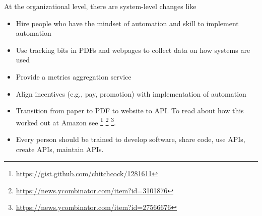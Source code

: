 At the organizational level, there are system-level changes like
\begin{itemize}
    \item Hire people who have the mindset of automation and skill to implement automation
    \item Use tracking bits in PDFs and webpages to collect data on how systems are used
    \item Provide a metrics aggregation service
    \item Align incentives (e.g., pay, promotion) with implementation of automation
    \item Transition from paper to PDF to website to API. To read about how this worked out at Amazon see \footnote{\href{https://gist.github.com/chitchcock/1281611}{https://gist.github.com/chitchcock/1281611}}
    \footnote{\href{https://news.ycombinator.com/item?id=3101876}{https://news.ycombinator.com/item?id=3101876}}
    \footnote{\href{https://news.ycombinator.com/item?id=27566676}{https://news.ycombinator.com/item?id=27566676}}.
    
    \item Every person should be trained to develop software, share code, use APIs, create APIs, maintain APIs.
\end{itemize}
